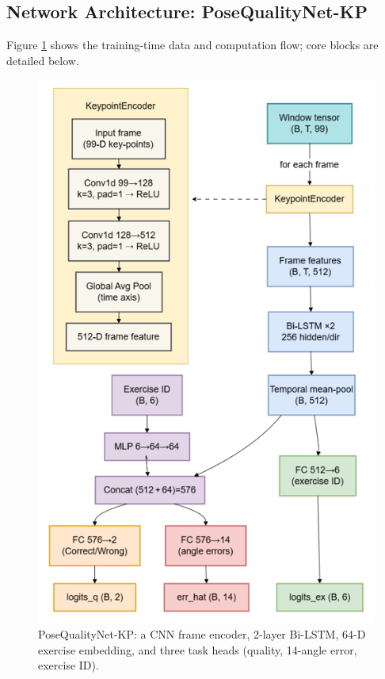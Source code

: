 \documentclass{article}
\begin{document}

\subsection{Network Architecture: PoseQualityNet-KP}
\label{ssec:arch}
Figure \ref{fig:modelflow} shows the training-time data and computation
flow; core blocks are detailed below.

\begin{figure}[t] 
  \centering
  \includegraphics[width=\linewidth]{figs/model_architecture}
  \caption{PoseQualityNet-KP: a CNN frame encoder, 2-layer Bi-LSTM,
           64-D exercise embedding, and three task heads
           (quality, 14-angle error, exercise ID).}
  \label{fig:modelflow}
  \label{fig:modelflow}
\end{figure}
\end{document}
